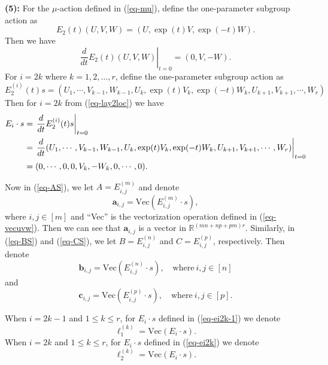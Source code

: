 \documentclass[reqno]{amsart}
\theoremstyle{definition}
\numberwithin{equation}{section}
\theoremstyle{remark}
\begin{document}
\textbf{(5):} For the $\mu$-action defined in (\ref{eq-mu}), define the one-parameter subgroup action as
\begin{equation*}
E_2(t) (U,V,W)
=\left(U, \exp(t)V , \exp(- t)W \right).
\end{equation*}
Then we have
\begin{equation}\label{eq-lay2loc}
\left.\frac{d}{dt} E_2(t)(U,V,W)\right|_{t=0}=(0,  V, -W).
\end{equation}
For $i=2k$ where $k=1,2,\ldots,r$,
define the one-parameter subgroup action as
$$E_2^{(i)}(t) s=(U_1,\cdots, V_{k-1}, W_{k-1}, U_k, \exp(t)V_k, 
\exp(-t)W_k,  U_{k+1}, V_{k+1}, \cdots, W_r)$$
Then for $i=2k$ from (\ref{eq-lay2loc}) we have
\begin{align}
E_i \cdot s&=\left.\frac{d}{dt} E_2^{(i)}(t) s \right|_{t=0}\label{eq-ei2k}\\
&=\left.\frac{d}{dt}(U_{1},\cdots, V_{k-1}, W_{k-1}, U_k, \exp(t)V_k, \exp(-t)W_k,  U_{k+1}, V_{k+1}, \cdots, W_{r})\right|_{t=0}\notag\\
&=(0,\cdots, 0,  0 , V_k, -W_k,  0,\cdots,0).\notag
\end{align}

Now in (\ref{eq-AS}), we let $A=E^{(m)}_{i,j}$ and denote
\begin{equation}\label{eq-aijs}
\mathbf{a}_{i,j}=\mathrm{Vec}(E^{(m)}_{i,j}\cdot s),
\end{equation}
where $i,j\in [m]$ and ``\textrm{Vec}'' is the vectorization operation defined in (\ref{eq-vecuvw}). Then we can see that $\mathbf{a}_{i,j}$ is a vector in 
$\mathbb{R}^{(mn+np+pm)r}$.
Similarly, in (\ref{eq-BS}) and (\ref{eq-CS}), we let $B=E^{(n)}_{i,j}$ and 
$C=E^{(p)}_{i,j}$, respectively. Then
denote
\begin{equation}\label{eq-bijs}
\mathbf{b}_{i,j}=\mathrm{Vec}(E^{(n)}_{i,j}\cdot s),\quad \text{where}~ i,j\in [n]
\end{equation}
and
\begin{equation}\label{eq-cijs}
\mathbf{c}_{i,j}=\mathrm{Vec}(E^{(p)}_{i,j}\cdot s), \quad \text{where}~  i,j\in [p].
\end{equation}

When $i=2k-1$ and $1\leq k\leq r$, for $E_{i}\cdot s$ defined in (\ref{eq-ei2k-1})  we denote
\begin{equation}\label{eq-ell1i}
\ell_1^{(k)}=\mathrm{Vec}(E_{i}\cdot s).
\end{equation}
When $i=2k$ and $1\leq k\leq r$, for
$E_{i}\cdot s$  defined in  (\ref{eq-ei2k}) we denote
\begin{equation}\label{eq-ell2i}
\ell_2^{(k)}=\mathrm{Vec}(E_{i}\cdot s).
\end{equation}
\end{document}
